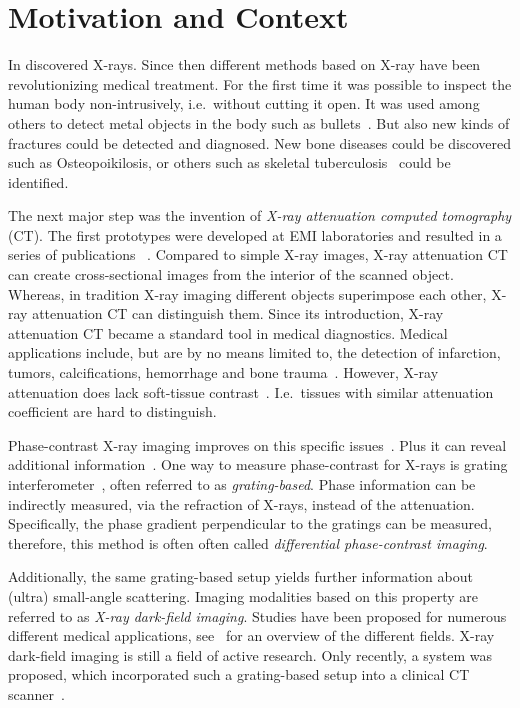 \chapter{Motivation and Context}\label{chap:introduction}

In \citeyear{rontgen_uber_1895} \citeauthor{rontgen_uber_1895} discovered X-rays. Since then
different methods based on X-ray have been revolutionizing medical treatment. For the first time it
was possible to inspect the human body non-intrusively, i.e.\ without cutting it open. It was used
among others to detect metal objects in the body such as bullets~\cite{haygood_skeletal_1996}. But
also new kinds of fractures could be detected and diagnosed. New bone diseases could be discovered
such as Osteopoikilosis, or others such as skeletal tuberculosis~\cite{haygood_skeletal_1996} could
be identified.

The next major step was the invention of \textit{X-ray attenuation computed tomography} (CT). The
first prototypes were developed at EMI laboratories and resulted in a series of publications
~\cite{hounsfield_computerized_1973,ambrose_computerized_1973,perry_computerized_1973}. Compared to
simple X-ray images, X-ray attenuation CT can create cross-sectional images from the interior of the
scanned object. Whereas, in tradition X-ray imaging different objects superimpose each other, X-ray
attenuation CT can distinguish them. Since its introduction, X-ray attenuation CT became a standard
tool in medical diagnostics. Medical applications include, but are by no means limited to, the
detection of infarction, tumors, calcifications, hemorrhage and bone
trauma~\cite[Chapter~5]{buchanan_advanced_2012}. However, X-ray attenuation does lack soft-tissue
contrast~\cite{pfeiffer_phase_2006}. I.e.\ tissues with similar attenuation coefficient are hard to
distinguish.

Phase-contrast X-ray imaging improves on this specific issues~\cite{lewis_medical_2004}. Plus it can
reveal additional information~\cite{hahn_numerical_2012}. One way to measure phase-contrast for
X-rays is grating interferometer~\cite{pfeiffer_hard-x-ray_2008}, often referred to as
\textit{grating-based}. Phase information can be indirectly measured, via the refraction of X-rays,
instead of the attenuation. Specifically, the phase gradient perpendicular to the gratings can be
measured, therefore, this method is often often called \textit{differential phase-contrast imaging}.

Additionally, the same grating-based setup yields further information about (ultra) small-angle
scattering. Imaging modalities based on this property are referred to as \textit{X-ray dark-field
	imaging}. Studies have been proposed for numerous different medical applications,
see~\cite[Chapter 1.3.1]{wieczorek_anisotropic_2017} for an overview of the different fields. X-ray
dark-field imaging is still a field of active research. Only recently, a system was proposed, which
incorporated such a grating-based setup into a clinical CT scanner~\cite{viermetz_dark-field_2022}.

